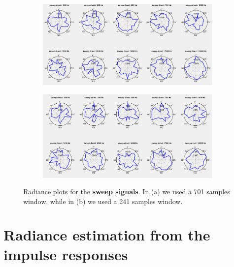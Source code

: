 \documentclass[a4paper]{article}
\begin{document}
\begin{figure}[h]
	\centering
	\begin{subfigure}{0.85\linewidth}
		\centering
		\includegraphics[width=\linewidth]{4b_radiance.png}
		\caption{}
	\end{subfigure}
	
	\begin{subfigure}{0.85\linewidth}
		\centering
		\includegraphics[width=\linewidth]{4b_radiance_120.png}
		\caption{}
	\end{subfigure}
	\caption{Radiance plots for the \textbf{sweep signals}. In (a) we used a 701 samples window, while in (b) we used a 241 samples window.}
	\label{fig:sweepradiance}
\end{figure}

\section{Radiance estimation from the impulse responses}
\end{document}
